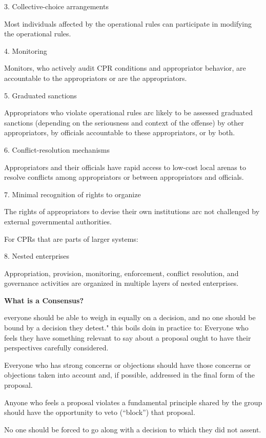 \documentclass{article}
\begin{document}
3. Collective-choice arrangements

Most individuals affected by the operational rules can participate in modifying the operational rules.

4. Monitoring

Monitors, who actively audit CPR conditions and appropriator behavior, are accountable to the appropriators or are the appropriators.

5. Graduated sanctions

Appropriators who violate operational rules arc likely to be assessed graduated sanctions (depending on the seriousness and context of the offense) by other appropriators, by officials accountable to these appropriators, or by both.

6. Conflict-resolution mechanisms

Appropriators and their officials have rapid access to low-cost local arenas to resolve conflicts among appropriators or between appropriators and officials.

7. Minimal recognition of rights to organize

The rights of appropriators to devise their own institutions arc not challenged by external governmental authorities.

For CPRs that are parts of larger systems:

8. Nested enterprises

Appropriation, provision, monitoring, enforcement, conflict resolution, and governance activities are organized in multiple layers of nested enterprises.





\pagebreak
{\huge \textbf{What is a Consensus?}}

everyone should be able to weigh in equally on a decision, and no one should be bound by a decision they detest."
this boils doin in practice to: Everyone who feels they have something relevant to say about a proposal ought to have their perspectives carefully considered.

Everyone who has strong concerns or objections should have those concerns or objections taken into account and, if possible, addressed in the final form of the proposal.

Anyone who feels a proposal violates a fundamental principle shared by the group should have the opportunity to veto (“block”) that proposal.

No one should be forced to go along with a decision to which they did not assent.
\end{document}
